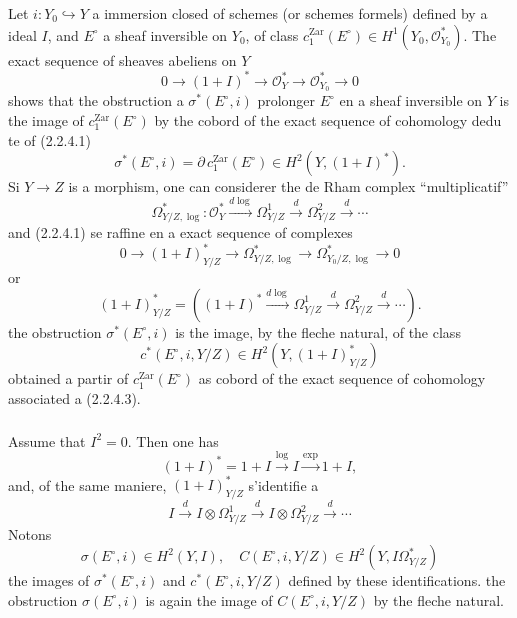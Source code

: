 \documentclass[12pt,a4paper]{article}
\theoremstyle{plain}
\theoremstyle{definition}
\theoremstyle{remark}
\begin{document}
\subsubsection{}
Let $i : Y_0 \hookrightarrow Y$ a immersion closed of schemes (or schemes formels) defined by a ideal $I$, and $E^\circ$ a sheaf inversible on $Y_0$, of class $c_1^\mathrm{Zar}(E^\circ) \in H^1(Y_0, \mathcal{O}_{Y_0}^*)$. The exact sequence of sheaves abeliens on $Y$
\begin{equation}\tag{2.2.4.1}
0 \longrightarrow (1+I)^* \longrightarrow \mathcal{O}_Y^* \longrightarrow \mathcal{O}_{Y_0}^* \longrightarrow 0 
\end{equation}
shows that the obstruction a $\sigma^*(E^\circ, i)$ prolonger $E^\circ$ en a sheaf inversible on $Y$ is the image of $c_1^\mathrm{Zar}(E^\circ)$ by the cobord of the exact sequence of cohomology dedu te of (2.2.4.1)
\begin{equation}\tag{2.2.4.2}
\sigma^*(E^\circ, i) = \partial \, c_1^\mathrm{Zar}(E^\circ) \in H^2(Y, (1+I)^*). 
\end{equation}
Si $Y \to Z$ is a morphism, one can considerer the de Rham complex ``multiplicatif''
\[
\Omega^*_{Y/Z, \log} : \mathcal{O}_Y^* \xrightarrow{d\log} \Omega^1_{Y/Z} \xrightarrow{d} \Omega^2_{Y/Z} \xrightarrow{d} \cdots
\]
and (2.2.4.1) se raffine en a exact sequence of complexes
\begin{equation}\tag{2.2.4.3}
0 \longrightarrow (1+I)^*_{Y/Z} \longrightarrow \Omega^*_{Y/Z, \log} \longrightarrow \Omega^*_{Y_0/Z, \log} \longrightarrow 0 
\end{equation}
or
\[
(1+I)^*_{Y/Z} = ((1+I)^* \xrightarrow{d\log} \Omega^1_{Y/Z} \xrightarrow{d} \Omega^2_{Y/Z} \xrightarrow{d} \cdots).
\]
the obstruction $\sigma^*(E^\circ, i)$ is the image, by the fleche natural, of the class
\begin{equation}\tag{2.2.4.4}
c^*(E^\circ, i, Y/Z) \in H^2(Y, (1+I)^*_{Y/Z}) 
\end{equation}
obtained a partir of $c_1^\mathrm{Zar}(E^\circ)$ as cobord of the exact sequence of cohomology associated a (2.2.4.3).

\subsubsection{}
Assume that $I^2 = 0$. Then one has
\[
(1+I)^* = 1+I \xrightarrow{\log} I \xrightarrow{\exp} 1+I,
\]
and, of the same maniere, $(1+I)^*_{Y/Z}$ s'identifie a
\[
I \xrightarrow{d} I \otimes \Omega^1_{Y/Z} \xrightarrow{d} I \otimes \Omega^2_{Y/Z} \xrightarrow{d} \cdots
\]
Notons
\begin{equation}\tag{2.2.5.1}
\sigma(E^\circ, i) \in H^2(Y, I), \quad C(E^\circ, i, Y/Z) \in H^2(Y, I\Omega^*_{Y/Z}) 
\end{equation}
the images of $\sigma^*(E^\circ, i)$ and $c^*(E^\circ, i, Y/Z)$ defined by these identifications. the obstruction $\sigma(E^\circ, i)$ is again the image of $C(E^\circ, i, Y/Z)$ by the fleche natural.
\end{document}
